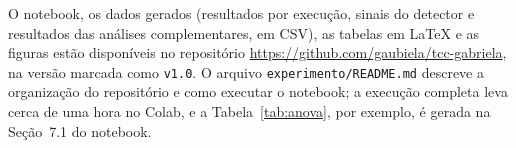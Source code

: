 O notebook, os dados gerados (resultados por execução, sinais do detector e
resultados das análises complementares, em CSV), as tabelas em \LaTeX{} e as
figuras estão disponíveis no repositório
\url{https://github.com/gaubiela/tcc-gabriela}, na versão marcada como
\texttt{v1.0}. O arquivo \texttt{experimento/README.md} descreve a
organização do repositório e como executar o notebook; a execução completa
leva cerca de uma hora no Colab, e a Tabela~\ref{tab:anova}, por exemplo, é
gerada na Seção~7.1 do notebook.